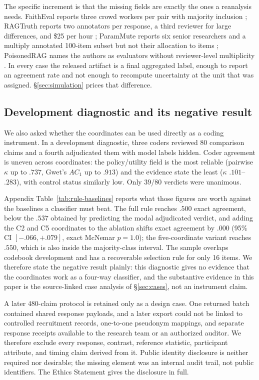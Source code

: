 \documentclass[11pt]{article}
\begin{document}
The specific increment is that the missing fields are exactly the ones a
reanalysis needs. FaithEval reports three crowd workers per pair with majority
inclusion \citep{rrag040}; RAGTruth reports two annotators per response, a
third reviewer for large differences, and \$25 per hour \citep{ragTruth2024};
ParamMute reports six senior researchers and a multiply annotated 100-item
subset but not their allocation to items \citep{rrag024}; PoisonedRAG names the
authors as evaluators without reviewer-level multiplicity
\citep{poisonedRAG2024}. In every case the released artifact is a final
aggregated label, enough to report an agreement rate and not enough to
recompute uncertainty at the unit that was assigned.
\S\ref{sec:simulation} prices that difference.

\subsection{Development diagnostic and its negative result}
\label{sec:development}

We also asked whether the coordinates can be used directly as a coding
instrument. In a development diagnostic, three coders reviewed 80 comparison
claims and a fourth adjudicated them with model labels hidden. Coder agreement
is uneven across coordinates: the policy/utility field is the most reliable
(pairwise $\kappa$ up to $.737$, Gwet's $AC_1$ up to $.913$) and the evidence
state the least ($\kappa$ $.101$--$.283$), with control status similarly low.
Only 39/80 verdicts were unanimous.

Appendix Table~\ref{tab:rule-baselines} reports what those figures are worth
against the baselines a classifier must beat. The full rule reaches $.500$
exact agreement, below the $.537$ obtained by predicting the modal adjudicated
verdict, and adding the C2 and C5 coordinates to the ablation shifts exact
agreement by $.000$ (95\% CI $[-.066, +.079]$, exact McNemar $p=1.0$); the
five-coordinate variant reaches $.550$, which is also inside the majority-class
interval. The sample overlaps codebook development and has a recoverable
selection rule for only 16 items. We therefore state the negative result
plainly: this diagnostic gives no evidence that the coordinates work as a
four-way classifier, and the substantive evidence in this paper is the
source-linked case analysis of \S\ref{sec:cases}, not an instrument claim.

A later 480-claim protocol is retained only as a design case. One returned
batch contained shared response payloads, and a later export could not be
linked to controlled recruitment records, one-to-one pseudonym mappings, and
separate response receipts available to the research team or an authorized
auditor. We therefore exclude every response, contrast, reference statistic,
participant attribute, and timing claim derived from it. Public identity
disclosure is neither required nor desirable; the missing element was an
internal audit trail, not public identifiers. The Ethics Statement gives the
disclosure in full.
\end{document}
